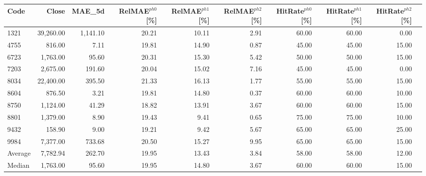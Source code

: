 \begingroup
\footnotesize
\begin{tabular}{lrrrrrrrrr}
\hline
Code & Close & MAE\_5d & RelMAE$^{ph0}$[\%] & RelMAE$^{ph1}$[\%] & RelMAE$^{ph2}$[\%] & HitRate$^{ph0}$[\%] & HitRate$^{ph1}$[\%] & HitRate$^{ph2}$[\%] \\
\hline
1321 & 39,260.00 & 1,141.10 & 20.21 & 10.11 & 2.91 & 60.00 & 60.00 & 0.00 \\
4755 & 816.00 & 7.11 & 19.81 & 14.90 & 0.87 & 45.00 & 45.00 & 15.00 \\
6723 & 1,763.00 & 95.60 & 20.31 & 15.30 & 5.42 & 50.00 & 50.00 & 15.00 \\
7203 & 2,675.00 & 191.60 & 20.04 & 15.02 & 7.16 & 45.00 & 45.00 & 0.00 \\
8034 & 22,400.00 & 395.50 & 21.33 & 16.13 & 1.77 & 55.00 & 55.00 & 15.00 \\
8604 & 876.50 & 3.21 & 19.81 & 14.80 & 0.37 & 60.00 & 60.00 & 10.00 \\
8750 & 1,124.00 & 41.29 & 18.82 & 13.91 & 3.67 & 60.00 & 60.00 & 15.00 \\
8801 & 1,379.00 & 8.90 & 19.43 & 9.41 & 0.65 & 75.00 & 75.00 & 10.00 \\
9432 & 158.90 & 9.00 & 19.21 & 9.42 & 5.67 & 65.00 & 65.00 & 25.00 \\
9984 & 7,377.00 & 733.68 & 20.50 & 15.27 & 9.95 & 65.00 & 65.00 & 15.00 \\
Average & 7,782.94 & 262.70 & 19.95 & 13.43 & 3.84 & 58.00 & 58.00 & 12.00 \\
Median & 1,763.00 & 95.60 & 19.95 & 14.80 & 3.67 & 60.00 & 60.00 & 15.00 \\
\hline
\end{tabular}
\endgroup

